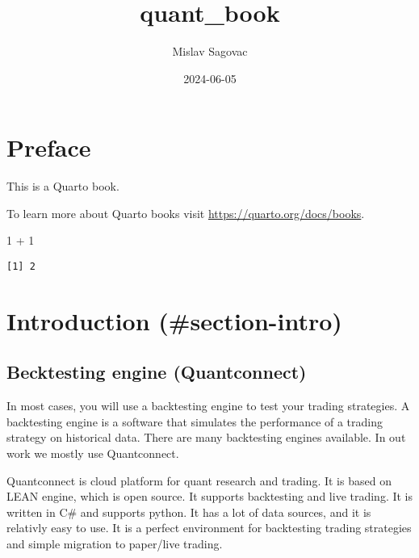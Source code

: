 \documentclass[
  letterpaper,
  DIV=11,
  numbers=noendperiod]{scrreprt}
\title{quant\_book}
\author{Mislav Sagovac}
\date{2024-06-05}
\newenvironment{Shaded}{\begin{snugshade}}{\end{snugshade}}
\newcommand{\DecValTok}[1]{\textcolor[rgb]{0.68,0.00,0.00}{#1}}
\newcommand{\SpecialCharTok}[1]{\textcolor[rgb]{0.37,0.37,0.37}{#1}}
\renewcommand*\contentsname{Table of contents}
\newcommand\contentsname{Table of contents}
\begin{document}
\maketitle

\renewcommand*\contentsname{Table of contents}
{
\hypersetup{linkcolor=}
\setcounter{tocdepth}{2}
\tableofcontents
}

\chapter*{Preface}\label{preface}


This is a Quarto book.

To learn more about Quarto books visit
\url{https://quarto.org/docs/books}.

\begin{Shaded}
\begin{Highlighting}[]
\DecValTok{1} \SpecialCharTok{+} \DecValTok{1}
\end{Highlighting}
\end{Shaded}

\begin{verbatim}
[1] 2
\end{verbatim}


\chapter{Introduction
(\#section-intro)}\label{introduction-section-intro}

\section{Becktesting engine
(Quantconnect)}\label{becktesting-engine-quantconnect}

In most cases, you will use a backtesting engine to test your trading
strategies. A backtesting engine is a software that simulates the
performance of a trading strategy on historical data. There are many
backtesting engines available. In out work we mostly use Quantconnect.

Quantconnect is cloud platform for quant research and trading. It is
based on LEAN engine, which is open source. It supports backtesting and
live trading. It is written in C\# and supports python. It has a lot of
data sources, and it is relativly easy to use. It is a perfect
environment for backtesting trading strategies and simple migration to
paper/live trading.
\end{document}
